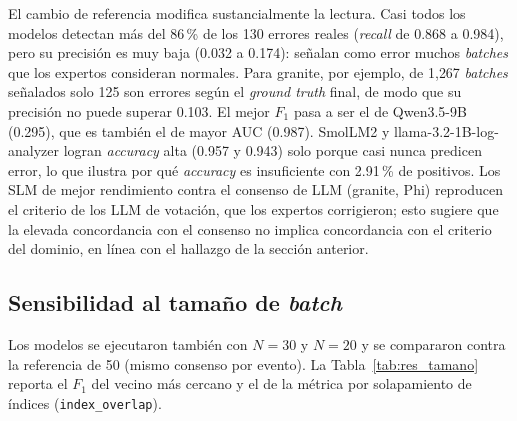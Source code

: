 El cambio de referencia modifica sustancialmente la lectura. Casi todos los modelos detectan más del 86\,\% de los 130 errores reales (\textit{recall} de 0.868 a 0.984), pero su precisión es muy baja (0.032 a 0.174): señalan como error muchos \textit{batches} que los expertos consideran normales. Para granite, por ejemplo, de 1{,}267 \textit{batches} señalados solo 125 son errores según el \textit{ground truth} final, de modo que su precisión no puede superar 0.103. El mejor $F_1$ pasa a ser el de Qwen3.5-9B (0.295), que es también el de mayor AUC (0.987). SmolLM2 y llama-3.2-1B-log-analyzer logran \textit{accuracy} alta (0.957 y 0.943) solo porque casi nunca predicen error, lo que ilustra por qué \textit{accuracy} es insuficiente con 2.91\,\% de positivos. Los SLM de mejor rendimiento contra el consenso de LLM (granite, Phi) reproducen el criterio de los LLM de votación, que los expertos corrigieron; esto sugiere que la elevada concordancia con el consenso no implica concordancia con el criterio del dominio, en línea con el hallazgo de la sección anterior.

\subsection{Sensibilidad al tamaño de \textit{batch}}\label{subsec:res_tamano}

Los modelos se ejecutaron también con $N=30$ y $N=20$ y se compararon contra la referencia de 50 (mismo consenso por evento). La Tabla~\ref{tab:res_tamano} reporta el $F_1$ del vecino más cercano y el de la métrica por solapamiento de índices (\texttt{index\_overlap}).


